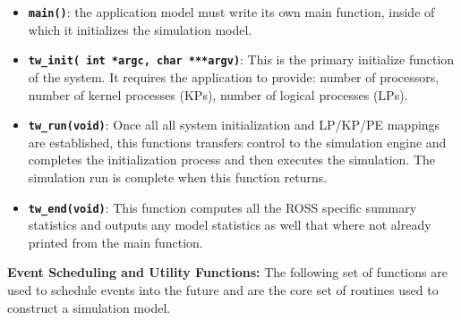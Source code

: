 \documentclass[12pt]{article}
\begin{document}
\begin{itemize}
\item {\tt\bf main()}: the application model must write its own main
function, inside of which it initializes the simulation model.

\item {\tt\bf tw\_init( int *argc, char ***argv)}: This is the primary
  initialize function of the system. It requires the application to provide:
  number of processors, number of kernel processes (KPs), number of
  logical processes (LPs).

\item {\tt\bf tw\_run(void)}: Once all all system initialization and
LP/KP/PE mappings are established, this functions transfers control to
the simulation engine and completes the initialization process and
then executes the simulation. The simulation run is complete when this
function returns.

\item {\tt\bf tw\_end(void)}: This function computes all the ROSS
specific summary statistics and outputs any model statistics as well
that where not already printed from the main function.
\end{itemize}

{\bf Event Scheduling and Utility Functions:} The following set of functions
are used to schedule events into the future and are the core set of routines
used to construct a simulation model.
\end{document}
